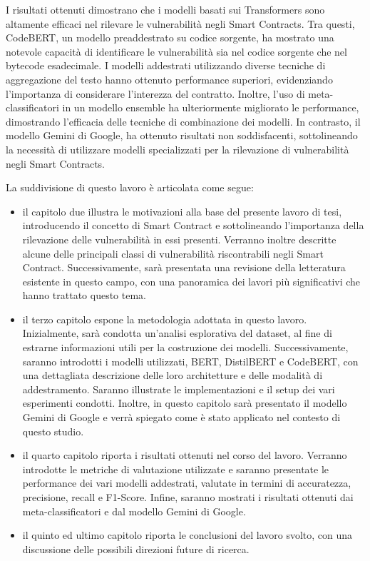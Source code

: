 \documentclass[../../Thesis.tex]{subfiles}
\begin{document}
I risultati ottenuti dimostrano che i modelli basati sui Transformers sono altamente efficaci nel rilevare le vulnerabilit\`a negli Smart Contracts. Tra questi, CodeBERT, un modello preaddestrato su codice sorgente, ha mostrato una notevole capacit\`a di identificare le vulnerabilit\`a sia nel codice sorgente che nel bytecode esadecimale. I modelli addestrati utilizzando diverse tecniche di aggregazione del testo hanno ottenuto performance superiori, evidenziando l'importanza di considerare l'interezza del contratto. Inoltre, l'uso di meta-classificatori in un modello ensemble ha ulteriormente migliorato le performance, dimostrando l'efficacia delle tecniche di combinazione dei modelli. In contrasto, il modello Gemini di Google, ha ottenuto risultati non soddisfacenti, sottolineando la necessit\`a di utilizzare modelli specializzati per la rilevazione di vulnerabilit\`a negli Smart Contracts.

La suddivisione di questo lavoro \`e articolata come segue:
\begin{itemize}
    \item il capitolo due illustra le motivazioni alla base del presente lavoro di tesi, introducendo il concetto di Smart Contract e sottolineando l'importanza della rilevazione delle vulnerabilit\`a in essi presenti. Verranno inoltre descritte alcune delle principali classi di vulnerabilit\`a riscontrabili negli Smart Contract. Successivamente, sar\`a presentata una revisione della letteratura esistente in questo campo, con una panoramica dei lavori pi\`u significativi che hanno trattato questo tema.
    \item il terzo capitolo espone la metodologia adottata in questo lavoro. Inizialmente, sar\`a condotta un'analisi esplorativa del dataset, al fine di estrarne informazioni utili per la costruzione dei modelli.  
    Successivamente, saranno introdotti i modelli utilizzati, BERT, DistilBERT e CodeBERT, con una dettagliata descrizione delle loro architetture e delle modalit\`a di addestramento. Saranno illustrate le implementazioni e il setup dei vari esperimenti condotti. Inoltre, in questo capitolo sar\`a presentato il modello Gemini di Google e verr\`a spiegato come \`e stato applicato nel contesto di questo studio.
    \item il quarto capitolo riporta i risultati ottenuti nel corso del lavoro. Verranno introdotte le metriche di valutazione utilizzate e saranno presentate le performance dei vari modelli addestrati, valutate in termini di accuratezza, precisione, recall e F1-Score. Infine, saranno mostrati i risultati ottenuti dai meta-classificatori e dal modello Gemini di Google.
    \item il quinto ed ultimo capitolo riporta le conclusioni del lavoro svolto, con una discussione  delle possibili direzioni future di ricerca.     
\end{itemize}
\end{document}
